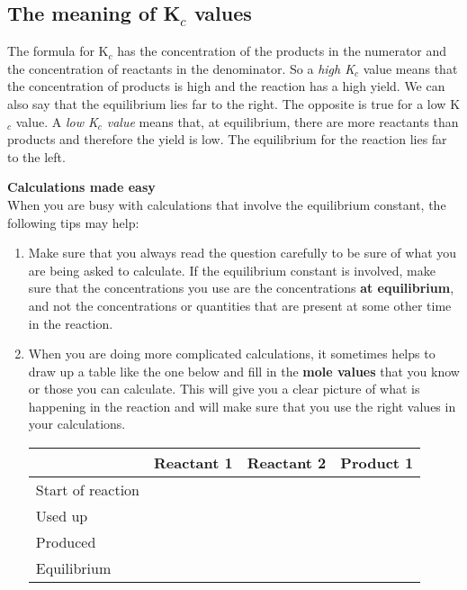 
\subsection{The meaning of K$_{c}$ values}

The formula for K$_{c}$ has the concentration of the products in the numerator and the concentration of reactants in the denominator. So a \textit{high K$_{c}$} value means that the concentration of products is high and the reaction has a high yield. We can also say that the equilibrium lies far to the right. The opposite is true for a low K$_{c}$ value. A \textit{low K$_{c}$ value} means that, at equilibrium, there are more reactants than products and therefore the yield is low. The equilibrium for the reaction lies far to the left.

\textbf{Calculations made easy}\\
When you are busy with calculations that involve the equilibrium constant, the following tips may help:\\

\begin{enumerate}
\item{
Make sure that you always read the question carefully to be sure of what you are being asked to calculate. If the equilibrium constant is involved, make sure that the concentrations you use are the concentrations \textbf{at equilibrium}, and not the concentrations or quantities that are present at some other time in the reaction. 
}

\item{When you are doing more complicated calculations, it sometimes helps to draw up a table like the one below and fill in the \textbf{mole values} that you know or those you can calculate. This will give you a clear picture of what is happening in the reaction and will make sure that you use the right values in your calculations. 


\begin{center}
\begin{tabular}{|l|c|c|c|}\hline
 & \textbf{Reactant 1} & \textbf{Reactant 2} & \textbf{Product 1}\\\hline
Start of reaction & & &  \\\hline
Used up & & &  \\\hline
Produced & & &  \\\hline
Equilibrium & & &  \\\hline
\end{tabular}
\end{center}
}
\end{enumerate}



